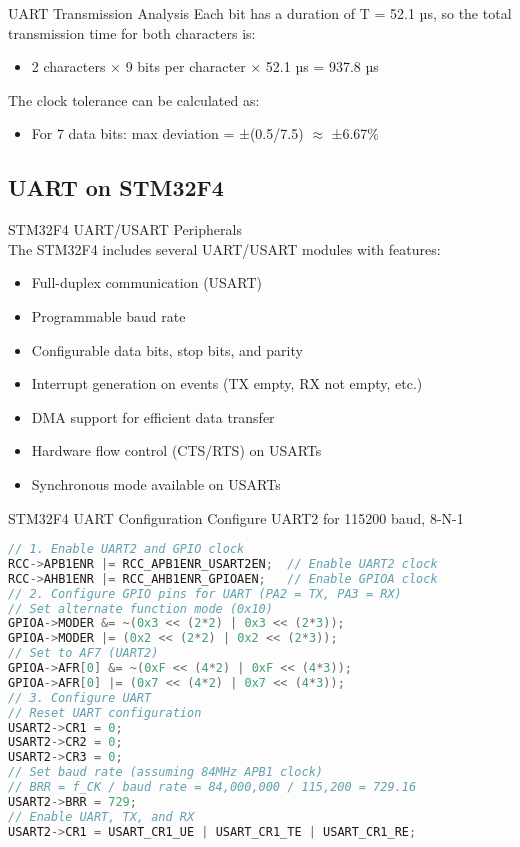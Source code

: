 \begin{example2}{UART Transmission Analysis}
Each bit has a duration of T = 52.1 µs, so the total transmission time for both characters is:
\begin{itemize}
    \item 2 characters × 9 bits per character × 52.1 µs = 937.8 µs
\end{itemize}

The clock tolerance can be calculated as:
\begin{itemize}
    \item For 7 data bits: max deviation = ±(0.5/7.5) $\approx$ ±6.67\%
\end{itemize}
\end{example2}


\subsection{UART on STM32F4}

\begin{concept}{STM32F4 UART/USART Peripherals}\\
The STM32F4 includes several UART/USART modules with features:
\begin{itemize}
    \item Full-duplex communication (USART)
    \item Programmable baud rate
    \item Configurable data bits, stop bits, and parity
    \item Interrupt generation on events (TX empty, RX not empty, etc.)
    \item DMA support for efficient data transfer
    \item Hardware flow control (CTS/RTS) on USARTs
    \item Synchronous mode available on USARTs
\end{itemize}
\end{concept}

\begin{code}{STM32F4 UART Configuration} Configure UART2 for 115200 baud, 8-N-1
\begin{lstlisting}[language=C, style=basesmol]
// 1. Enable UART2 and GPIO clock
RCC->APB1ENR |= RCC_APB1ENR_USART2EN;  // Enable UART2 clock
RCC->AHB1ENR |= RCC_AHB1ENR_GPIOAEN;   // Enable GPIOA clock
// 2. Configure GPIO pins for UART (PA2 = TX, PA3 = RX)
// Set alternate function mode (0x10)
GPIOA->MODER &= ~(0x3 << (2*2) | 0x3 << (2*3));
GPIOA->MODER |= (0x2 << (2*2) | 0x2 << (2*3));
// Set to AF7 (UART2)
GPIOA->AFR[0] &= ~(0xF << (4*2) | 0xF << (4*3));
GPIOA->AFR[0] |= (0x7 << (4*2) | 0x7 << (4*3));
// 3. Configure UART
// Reset UART configuration
USART2->CR1 = 0;
USART2->CR2 = 0;
USART2->CR3 = 0;
// Set baud rate (assuming 84MHz APB1 clock)
// BRR = f_CK / baud rate = 84,000,000 / 115,200 = 729.16
USART2->BRR = 729;
// Enable UART, TX, and RX
USART2->CR1 = USART_CR1_UE | USART_CR1_TE | USART_CR1_RE;
\end{lstlisting}
\end{code}

